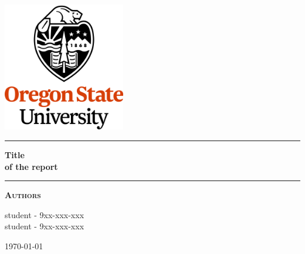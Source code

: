 
\begin{titlepage}
\begin{center}
\vspace{2cm}
\includegraphics[width=0.4\textwidth]{root/OSU.png}~\\[1cm]
\vspace{2cm}

\hrule
\vspace{.5cm}
{ \huge \bfseries Title\\ of the report} %
\vspace{.5cm}

\hrule
\vspace{1.5cm}

\textsc{\textbf{Authors}}\\
\vspace{.5cm}
\centering

student - 9xx-xxx-xxx\\
student - 9xx-xxx-xxx\\

\vspace{4cm}

\centering \today %
\end{center}
\end{titlepage}